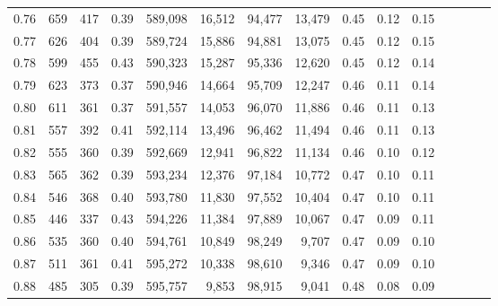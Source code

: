 \begin{tabular}{rrrcrrrrrrrrrrr}
0.76 &     659 &    417 &                                       0.39 &  589,098 &   16,512 &   94,477 &   13,479 &  0.45 &  0.12 &                         0.15 \\
0.77 &     626 &    404 &                                       0.39 &  589,724 &   15,886 &   94,881 &   13,075 &  0.45 &  0.12 &                         0.15 \\
0.78 &     599 &    455 &                                       0.43 &  590,323 &   15,287 &   95,336 &   12,620 &  0.45 &  0.12 &                         0.14 \\
0.79 &     623 &    373 &                                       0.37 &  590,946 &   14,664 &   95,709 &   12,247 &  0.46 &  0.11 &                         0.14 \\
0.80 &     611 &    361 &                                       0.37 &  591,557 &   14,053 &   96,070 &   11,886 &  0.46 &  0.11 &                         0.13 \\
0.81 &     557 &    392 &                                       0.41 &  592,114 &   13,496 &   96,462 &   11,494 &  0.46 &  0.11 &                         0.13 \\
0.82 &     555 &    360 &                                       0.39 &  592,669 &   12,941 &   96,822 &   11,134 &  0.46 &  0.10 &                         0.12 \\
0.83 &     565 &    362 &                                       0.39 &  593,234 &   12,376 &   97,184 &   10,772 &  0.47 &  0.10 &                         0.11 \\
0.84 &     546 &    368 &                                       0.40 &  593,780 &   11,830 &   97,552 &   10,404 &  0.47 &  0.10 &                         0.11 \\
0.85 &     446 &    337 &                                       0.43 &  594,226 &   11,384 &   97,889 &   10,067 &  0.47 &  0.09 &                         0.11 \\
0.86 &     535 &    360 &                                       0.40 &  594,761 &   10,849 &   98,249 &    9,707 &  0.47 &  0.09 &                         0.10 \\
0.87 &     511 &    361 &                                       0.41 &  595,272 &   10,338 &   98,610 &    9,346 &  0.47 &  0.09 &                         0.10 \\
0.88 &     485 &    305 &                                       0.39 &  595,757 &    9,853 &   98,915 &    9,041 &  0.48 &  0.08 &                         0.09 \\

\end{tabular}
